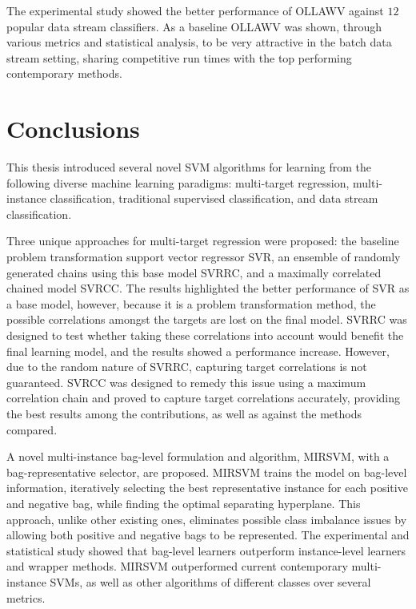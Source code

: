 \documentclass[reqno]{vcuthesis}
\numberwithin{equation}{chapter}
\begin{document}
The experimental study showed the better performance of OLLAWV against $12$ popular data stream classifiers. As a baseline OLLAWV was shown, through various metrics and statistical analysis, to be very attractive in the batch data stream setting, sharing competitive run times with the top performing contemporary methods. 

\chapter{Conclusions}
This thesis introduced several novel SVM algorithms for learning from the following diverse machine learning paradigms: multi-target regression, multi-instance classification, traditional supervised classification, and data stream classification.

Three unique approaches for multi-target regression were proposed: the baseline problem transformation support vector regressor SVR, an ensemble of randomly generated chains using this base model SVRRC, and a maximally correlated chained model SVRCC. The results highlighted the better performance of SVR as a base model, however, because it is a problem transformation method, the possible correlations amongst the targets are lost on the final model. SVRRC was designed to test whether taking these correlations into account would benefit the final learning model, and the results showed a performance increase. However, due to the random nature of SVRRC, capturing target correlations is not guaranteed. SVRCC was designed to remedy this issue using a maximum correlation chain and proved to capture target correlations accurately, providing the best results among the contributions, as well as against the methods compared. 

A novel multi-instance bag-level formulation and algorithm, MIRSVM, with a bag-representative selector, are proposed. MIRSVM trains the model on bag-level information, iteratively selecting the best representative instance for each positive and negative bag, while finding the optimal separating hyperplane. This approach, unlike other existing ones, eliminates possible class imbalance issues by allowing both positive and negative bags to be represented. The experimental and statistical study showed that bag-level learners outperform instance-level learners and wrapper methods. MIRSVM outperformed current contemporary multi-instance SVMs, as well as other algorithms of different classes over several metrics.
\end{document}
